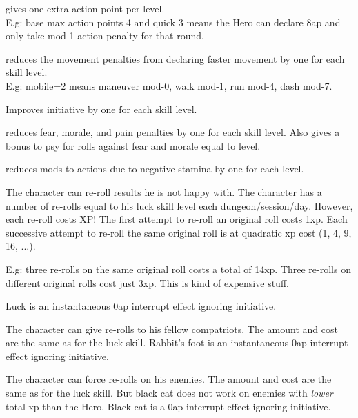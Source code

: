  gives one extra action point per level. \\
E.g: base max action points 4 and quick 3 means the Hero can declare 8ap and only take mod-1 action penalty for that round.


 reduces the movement penalties from declaring faster movement by one for each skill level. \\
E.g: mobile=2 means maneuver mod-0, walk mod-1, run mod-4, dash mod-7.


 Improves initiative by one for each skill level.


 reduces fear, morale, and pain penalties by one for each skill level. Also gives a bonus to psy for rolls against fear and morale equal to level.


 reduces mods to actions due to negative stamina by one for each level.


 The character can re-roll results he is not happy with. The character has a number of re-rolls equal to his luck skill level each dungeon/session/day. However, each re-roll costs XP! The first attempt to re-roll an original roll costs 1xp. Each successive attempt to re-roll the same original roll is at quadratic xp cost (1, 4, 9, 16, ...).

E.g: three re-rolls on the same original roll costs a total of 14xp. Three re-rolls on different original rolls cost just 3xp. This is kind of expensive stuff.

Luck is an instantaneous 0ap interrupt effect ignoring initiative.


 The character can give re-rolls to his fellow compatriots. The amount and cost are the same as for the luck skill.
Rabbit's foot is an instantaneous 0ap interrupt effect ignoring initiative.


 The character can force re-rolls on his enemies. The amount and cost are the same as for the luck skill. But black cat does not work on enemies with \emph{lower} total xp than the Hero.
Black cat is a 0ap interrupt effect ignoring initiative.



